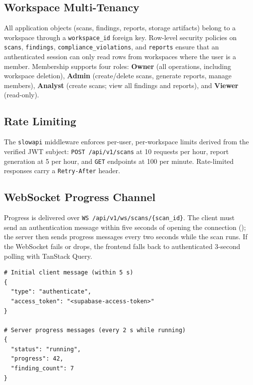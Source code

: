 \documentclass[conference]{IEEEtran}
\begin{document}
\subsection{Workspace Multi-Tenancy}
All application objects (scans, findings, reports, storage artifacts) belong to a
workspace through a \texttt{workspace\_id} foreign key. Row-level security
policies on \texttt{scans}, \texttt{findings}, \texttt{compliance\_violations},
and \texttt{reports} ensure that an authenticated session can only read rows from
workspaces where the user is a member. Membership supports four roles:
\textbf{Owner} (all operations, including workspace deletion), \textbf{Admin}
(create/delete scans, generate reports, manage members), \textbf{Analyst}
(create scans; view all findings and reports), and \textbf{Viewer} (read-only).

\subsection{Rate Limiting}
The \texttt{slowapi} middleware enforces per-user, per-workspace limits derived
from the verified JWT subject: \texttt{POST /api/v1/scans} at 10 requests per
hour, report generation at 5 per hour, and \texttt{GET} endpoints at 100 per
minute. Rate-limited responses carry a \texttt{Retry-After} header.

\subsection{WebSocket Progress Channel}
Progress is delivered over \texttt{WS /api/v1/ws/scans/\allowbreak\{scan\_id\}}.
The client must send an authentication message within five seconds of opening
the connection (); the server then sends progress messages every two
seconds while the scan runs. If the WebSocket fails or drops, the frontend falls
back to authenticated 3-second polling with TanStack Query.

\begin{lstlisting}[language=JSONC, label={lst:ws},
  caption={WebSocket authentication and progress messages.}]
# Initial client message (within 5 s)
{
  "type": "authenticate",
  "access_token": "<supabase-access-token>"
}

# Server progress messages (every 2 s while running)
{
  "status": "running",
  "progress": 42,
  "finding_count": 7
}
\end{lstlisting}

\end{document}
